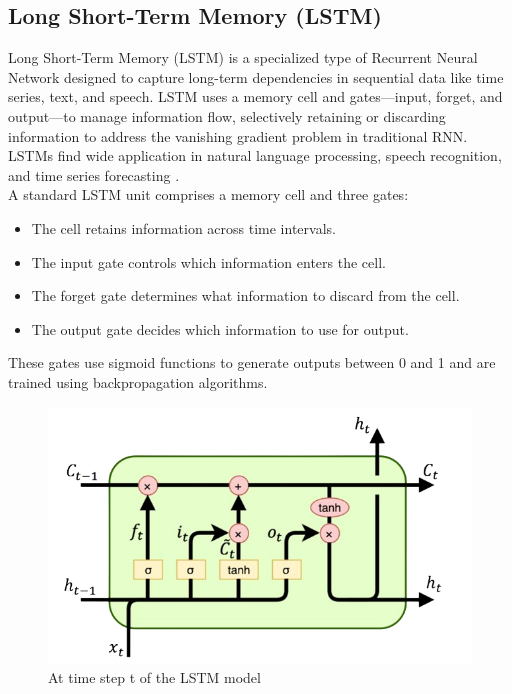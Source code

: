 \documentclass{ieeeojies}
\begin{document}
\subsection{Long Short-Term Memory (LSTM)}
Long Short-Term Memory (LSTM) is a specialized type of Recurrent Neural Network designed to capture long-term dependencies in sequential data like time series, text, and speech. LSTM uses a memory cell and gates—input, forget, and output—to manage information flow, selectively retaining or discarding information to address the vanishing gradient problem in traditional RNN. LSTMs find wide application in natural language processing, speech recognition, and time series forecasting \cite{b15}.\\
A standard LSTM unit comprises a memory cell and three gates:
\begin{itemize}
    \item The cell retains information across time intervals.
    \item The input gate controls which information enters the cell.
    \item The forget gate determines what information to discard from the cell.
    \item The output gate decides which information to use for output.
\end{itemize}
These gates use sigmoid functions to generate outputs between 0 and 1 and are trained using backpropagation algorithms.
\begin{figure}[H]
  \centering
  \begin{minipage}{0.5\linewidth}
    \centering
    \includegraphics[width=\linewidth]{bibliography/Figure/models/LSTM.png}
    \caption{At time step t of the LSTM model}
    \label{fig9}
  \end{minipage}
\end{figure}
\end{document}
